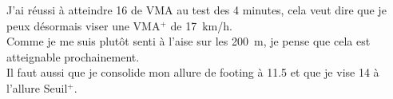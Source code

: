 \documentclass{article}
\begin{document}
    J'ai réussi à atteindre 16 de VMA au test des 4 minutes, cela veut dire que je peux désormais viser une VMA$^+$ de 17 km/h.\\
    Comme je me suis plutôt senti à l'aise sur les 200 m, je pense que cela est atteignable prochainement.\\
    Il faut aussi que je consolide mon allure de footing à 11.5 et que je vise 14 à l'allure Seuil$^+$.
\end{document}
